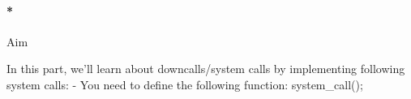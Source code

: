 \documentclass[]{article}
\newenvironment{Shaded}{}{}
\newcommand{\ExtensionTok}[1]{{#1}}
\newcommand{\NormalTok}[1]{{#1}}
\let\oldparagraph\paragraph
\renewcommand{\paragraph}[1]{\oldparagraph{#1}\mbox{}}
\begin{document}
\begin{Shaded}
\end{Shaded}

\paragraph*{Aim}\label{aim-12}

In this part, we'll learn about downcalls/system calls by implementing
following system calls: - You need to define the following function:
system\_call();
\end{document}
